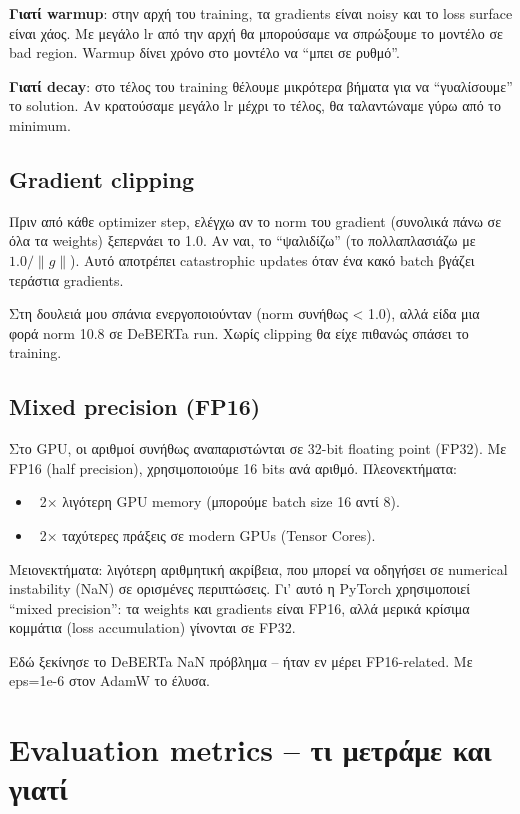 \documentclass[12pt]{fphw}
\begin{document}
\textbf{Γιατί warmup}: στην αρχή του training, τα gradients είναι noisy και το loss surface είναι χάος. Με μεγάλο lr από την αρχή θα μπορούσαμε να σπρώξουμε το μοντέλο σε bad region. Warmup δίνει χρόνο στο μοντέλο να ``μπει σε ρυθμό''.

\textbf{Γιατί decay}: στο τέλος του training θέλουμε μικρότερα βήματα για να ``γυαλίσουμε'' το solution. Αν κρατούσαμε μεγάλο lr μέχρι το τέλος, θα ταλαντώναμε γύρω από το minimum.

\subsection{Gradient clipping}

Πριν από κάθε optimizer step, ελέγχω αν το norm του gradient (συνολικά πάνω σε όλα τα weights) ξεπερνάει το 1.0. Αν ναι, το ``ψαλιδίζω'' (το πολλαπλασιάζω με $1.0 / \|g\|$). Αυτό αποτρέπει catastrophic updates όταν ένα κακό batch βγάζει τεράστια gradients.

Στη δουλειά μου σπάνια ενεργοποιούνταν (norm συνήθως < 1.0), αλλά είδα μια φορά norm 10.8 σε DeBERTa run. Χωρίς clipping θα είχε πιθανώς σπάσει το training.

\subsection{Mixed precision (FP16)}

Στο GPU, οι αριθμοί συνήθως αναπαριστώνται σε 32-bit floating point (FP32). Με FP16 (half precision), χρησιμοποιούμε 16 bits ανά αριθμό. Πλεονεκτήματα:
\begin{itemize}
    \item ~2× λιγότερη GPU memory (μπορούμε batch size 16 αντί 8).
    \item ~2× ταχύτερες πράξεις σε modern GPUs (Tensor Cores).
\end{itemize}

Μειονεκτήματα: λιγότερη αριθμητική ακρίβεια, που μπορεί να οδηγήσει σε numerical instability (NaN) σε ορισμένες περιπτώσεις. Γι' αυτό η PyTorch χρησιμοποιεί ``mixed precision'': τα weights και gradients είναι FP16, αλλά μερικά κρίσιμα κομμάτια (loss accumulation) γίνονται σε FP32.

Εδώ ξεκίνησε το DeBERTa NaN πρόβλημα -- ήταν εν μέρει FP16-related. Με eps=1e-6 στον AdamW το έλυσα.

\section{Evaluation metrics -- τι μετράμε και γιατί}
\end{document}
